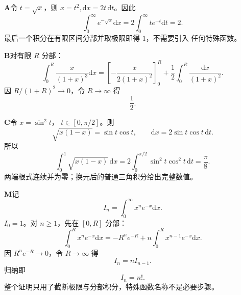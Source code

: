 \begin{solutionBox}
\textbf{A}\quad 令 \(t=\sqrt x\)，则
\(x=t^2,\mathrm dx=2t\,\mathrm dt\)。因此
\[
\int_0^\infty e^{-\sqrt x}\mathrm dx
=2\int_0^\infty te^{-t}\mathrm dt=2.
\]
最后一个积分在有限区间分部并取极限即得 \(1\)，不需要引入
任何特殊函数。
\end{solutionBox}
\begin{solutionBox}
\textbf{B}\quad 对有限 \(R\) 分部：
\[
\int_0^R\frac{x}{(1+x)^3}\mathrm dx
=\left[-\frac{x}{2(1+x)^2}\right]_0^R
+\frac12\int_0^R\frac{\mathrm dx}{(1+x)^2}.
\]
因 \(R/(1+R)^2\to0\)，令 \(R\to\infty\) 得
\[
\boxed{\frac12}.
\]
\end{solutionBox}
\begin{solutionBox}
\textbf{C}\quad 令 \(x=\sin^2t\)，
\(t\in[0,\pi/2]\)。则
\[
\sqrt{x(1-x)}=\sin t\cos t,\qquad
\mathrm dx=2\sin t\cos t\,\mathrm dt.
\]
所以
\[
\int_0^1\sqrt{x(1-x)}\,\mathrm dx
=2\int_0^{\pi/2}\sin^2t\cos^2t\,\mathrm dt
=\frac\pi8.
\]
两端根式连续并为零；换元后的普通三角积分给出完整数值。
\end{solutionBox}
\begin{solutionBox}
\textbf{M}\quad 记
\[
I_n=\int_0^\infty x^ne^{-x}\mathrm dx.
\]
\(I_0=1\)。对 \(n\ge1\)，先在 \([0,R]\) 分部：
\[
\int_0^Rx^ne^{-x}\mathrm dx
=-R^ne^{-R}+n\int_0^Rx^{n-1}e^{-x}\mathrm dx.
\]
因 \(R^ne^{-R}\to0\)，令 \(R\to\infty\) 得
\[
I_n=nI_{n-1}.
\]
归纳即
\[
\boxed{I_n=n!}.
\]
整个证明只用了截断极限与分部积分，特殊函数名称不是必要步骤。
\end{solutionBox}
